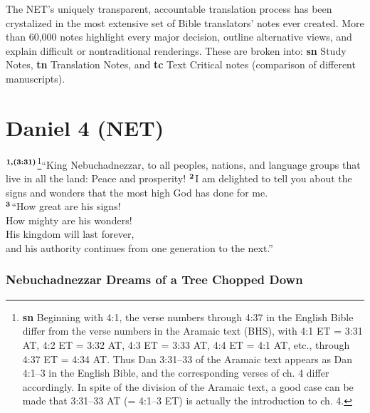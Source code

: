 \documentclass[12pt,a4paper,final]{article}
\renewcommand{\textsuperscript}[1]{\ensuremath{^{\textbf{\scriptsize #1}}}}
\begin{document}
The NET’s uniquely transparent, accountable translation process has been crystalized in the most extensive set of Bible translators’ notes ever created. More than 60,000 notes highlight every major decision, outline alternative views, and explain difficult or nontraditional renderings. These are broken into: \textbf{sn} Study Notes, \textbf{tn} Translation Notes, and \textbf{tc} Text Critical notes (comparison of different manuscripts).

\section*{Daniel 4 (NET)}

\textsuperscript{1,(3:31)}\footnote{\textbf{sn} Beginning with 4:1, the verse numbers through 4:37 in the English Bible differ from the verse numbers in the Aramaic text (BHS), with 4:1 ET = 3:31 AT, 4:2 ET = 3:32 AT, 4:3 ET = 3:33 AT, 4:4 ET = 4:1 AT, etc., through 4:37 ET = 4:34 AT. Thus Dan 3:31–33 of the Aramaic text appears as Dan 4:1–3 in the English Bible, and the corresponding verses of ch. 4 differ accordingly. In spite of the division of the Aramaic text, a good case can be made that 3:31–33 AT (= 4:1–3 ET) is actually the introduction to ch. 4.}“King Nebuchadnezzar, to all peoples, nations, and language groups that live in all the land: Peace and prosperity! \textsuperscript{2}I am delighted to tell you about the signs and wonders that the most high God has done for me.\\ 
    \textsuperscript{3}“How great are his signs! \\
    How mighty are his wonders! \\
    His kingdom will last forever, \\ 
    and his authority continues from one generation to the next.” 

\subsubsection*{Nebuchadnezzar Dreams of a Tree Chopped Down}
\end{document}
